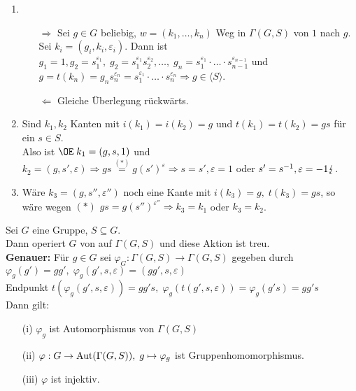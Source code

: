 \documentclass[a4paper, 10pt]{report}
\begin{document}
\begin{Bew} 
\begin{enumerate}
  \item
  \begin{itemize}
    \item[$\Rightarrow$] Sei $g \in G$ beliebig, $w=(k_1, \ldots, k_n)$ Weg in
    $\Gamma(G,S)$ von $1$ nach $g$.\\
    Sei $k_i=(g_i, k_i, \varepsilon_i)$.
    Dann ist $g_1 = 1, g_2 = s_1^{\varepsilon_1},\; g_2 =
    s_1^{\varepsilon_1}s_2^{\varepsilon_2}, \ldots,\; g_n = s_1^{\varepsilon_1}
    \cdot \ldots \cdot s_{n-1}^{\varepsilon_{n-1}}$ und $g = t(k_n)=g_n
    s_n^{\varepsilon_n} = s_1^{\varepsilon_1} \cdot \ldots \cdot
    s_n^{\varepsilon_n} \Rightarrow g \in \langle S \rangle$.
    \item[$\Leftarrow$] Gleiche Überlegung rückwärts.
  \end{itemize}
  \item Sind $k_1, k_2$ Kanten mit $i(k_1) = i(k_2) = g$ und $t(k_1)=t(k_2) =
  gs$ für ein $s \in S$.\\
  Also ist $\OE \; k_1 = (g,s,1)$ und $k_2=(g,s',\varepsilon) \Rightarrow g s
  \overset{(*)}{=} g (s')^{\varepsilon} \Rightarrow s=s', \varepsilon=1$ oder
  $s'=s^{-1}, \varepsilon=-1 \lightning$.
  \item Wäre $k_3 = (g,s'', \varepsilon'')$ noch eine Kante mit $i(k_3)=g, \;
  t(k_3)=gs$, so wäre wegen $(*)$ $gs = g(s'')^{\varepsilon''} \Rightarrow k_3 =
  k_1$ oder $k_3 = k_2$.
\end{enumerate}
\end{Bew}

\begin{Bem}
Sei $G$ eine Gruppe, $S \subseteq G$.\\
Dann operiert $G$ von  auf $\Gamma(G,S)$ und diese Aktion ist treu.\\
\textbf{Genauer:} Für $g \in G$ sei $\varphi_G: \Gamma(G,S) \to \Gamma(G,S)$
gegeben durch $\varphi_g(g') = g g', \; \varphi_g(g', s, \varepsilon) = (g g', s,
\varepsilon)$\\
Endpunkt $t(\varphi_g(g', s, \varepsilon))=gg's, \; \varphi_g(t(g', s,
\varepsilon)) = \varphi_g(g's) = gg's$\\
Dann gilt:
\begin{enumerate}
  \item[(i)] $\varphi_g$ ist Automorphismus von $\Gamma(G,S)$
  \item[(ii)] $\varphi: G \to \mbox{Aut}(\Gamma(G,S)), \; g \mapsto \varphi_g$ ist
  Gruppenhomomorphismus.
  \item[(iii)] $\varphi$ ist injektiv.
\end{enumerate}
\end{Bem}
\end{document}
